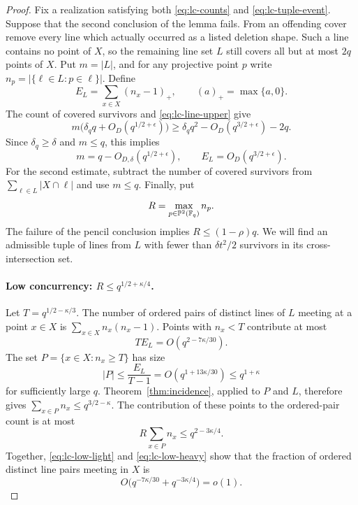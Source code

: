 \begin{proof}
Fix a realization satisfying both \eqref{eq:lc-counts} and
\eqref{eq:lc-tuple-event}. Suppose that the second conclusion of the
lemma fails. From an offending cover remove every line which actually
occurred as a listed deletion shape. Such a line contains no point of
$X$, so the remaining line set $L$ still covers all but at most $2q$
points of $X$. Put $m=|L|$, and for any projective point $p$ write
$n_p=|\{\ell\in L:p\in\ell\}|$. Define
\[
 E_L=\sum_{x\in X}(n_x-1)_+,
 \qquad (a)_+=\max\{a,0\}.
\]
The count of covered survivors and \eqref{eq:lc-line-upper} give
\[
 m\bigl(\delta_q q+O_D(q^{1/2+\epsilon})\bigr)
 \geq\delta_q q^2-O_D(q^{3/2+\epsilon})-2q.
\]
Since $\delta_q\geq\delta$ and $m\leq q$, this implies
\begin{equation}\label{eq:lc-cover-counts}
 m=q-O_{D,\delta}(q^{1/2+\epsilon}),\qquad
 E_L=O_D(q^{3/2+\epsilon}).
\end{equation}
For the second estimate, subtract the number of covered survivors
from $\sum_{\ell\in L}|X\cap\ell|$ and use $m\leq q$.
Finally, put
\[
 R=\max_{p\in\mathbb P^2(\mathbb F_q)}n_p.
\]
The failure of the pencil conclusion implies $R\leq(1-\rho)q$.
We will find an admissible tuple of lines from $L$ with fewer than
$\delta t^2/2$ survivors in its cross-intersection set.

\paragraph{Low concurrency: $R\leq q^{1/2+\kappa/4}$.}
Let $T=q^{1/2-\kappa/3}$. The number of ordered pairs of distinct lines
of $L$ meeting at a point $x\in X$ is $\sum_{x\in X}n_x(n_x-1)$.
Points with $n_x<T$ contribute at most
\begin{equation}\label{eq:lc-low-light}
 T E_L=O(q^{2-7\kappa/30}).
\end{equation}
The set $P=\{x\in X:n_x\geq T\}$ has size
\[
 |P|\leq\frac{E_L}{T-1}
      =O(q^{1+13\kappa/30})\leq q^{1+\kappa}
\]
for sufficiently large $q$. Theorem~\ref{thm:incidence}, applied to
$P$ and $L$, therefore gives $\sum_{x\in P}n_x\leq q^{3/2-\kappa}$.
The contribution of these points to the ordered-pair count is at most
\begin{equation}\label{eq:lc-low-heavy}
 R\sum_{x\in P}n_x\leq q^{2-3\kappa/4}.
\end{equation}
Together, \eqref{eq:lc-low-light} and \eqref{eq:lc-low-heavy} show that
the fraction of ordered distinct line pairs meeting in $X$ is
\begin{equation}\label{eq:lc-low-pair-fraction}
 O\bigl(q^{-7\kappa/30}+q^{-3\kappa/4}\bigr)=o(1).
\end{equation}


\end{proof}
